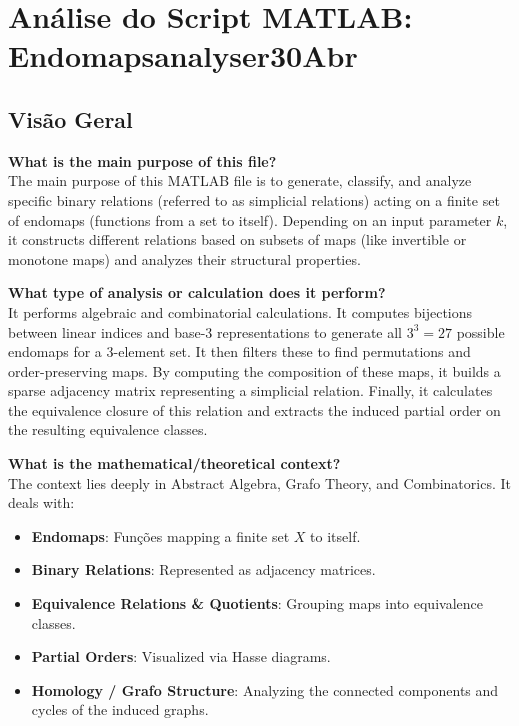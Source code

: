 \chapter{Análise do Script MATLAB: Endomapsanalyser30Abr}

\section{Visão Geral}

\textbf{What is the main purpose of this file?} \\
The main purpose of this MATLAB file is to generate, classify, and analyze specific binary relations (referred to as simplicial relations) acting on a finite set of endomaps (functions from a set to itself). Depending on an input parameter $k$, it constructs different relations based on subsets of maps (like invertible or monotone maps) and analyzes their structural properties.

\textbf{What type of analysis or calculation does it perform?} \\
It performs algebraic and combinatorial calculations. It computes bijections between linear indices and base-3 representations to generate all $3^3 = 27$ possible endomaps for a 3-element set. It then filters these to find permutations and order-preserving maps. By computing the composition of these maps, it builds a sparse adjacency matrix representing a simplicial relation. Finally, it calculates the equivalence closure of this relation and extracts the induced partial order on the resulting equivalence classes.

\textbf{What is the mathematical/theoretical context?} \\
The context lies deeply in Abstract Algebra, Grafo Theory, and Combinatorics. It deals with:
\begin{itemize}
    \item \textbf{Endomaps}: Funções mapping a finite set $X$ to itself.
    \item \textbf{Binary Relations}: Represented as adjacency matrices.
    \item \textbf{Equivalence Relations \& Quotients}: Grouping maps into equivalence classes.
    \item \textbf{Partial Orders}: Visualized via Hasse diagrams.
    \item \textbf{Homology / Grafo Structure}: Analyzing the connected components and cycles of the induced graphs.
\end{itemize}

